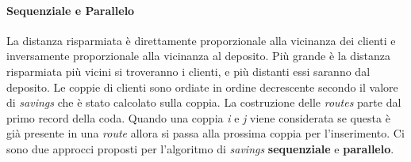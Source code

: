\documentclass[]{article}
\begin{document}
\paragraph{Sequenziale e Parallelo } \hfill
La distanza risparmiata è direttamente proporzionale alla vicinanza dei clienti e inversamente proporzionale alla vicinanza al deposito.
Più grande è la distanza risparmiata più vicini si troveranno i clienti, e più distanti essi saranno dal deposito.
Le coppie di clienti sono ordiate in ordine decrescente secondo il valore di \emph{savings} che è stato calcolato sulla coppia.
La costruzione delle \emph{routes} parte dal primo record della coda. Quando una coppia \emph{i}  e \emph{j} viene considerata se questa è già presente in una \emph{route} allora si passa alla prossima coppia per l'inserimento.
Ci sono due approcci proposti per l'algoritmo di \emph{savings} \textbf{sequenziale}  e \textbf{parallelo}.
\end{document}
